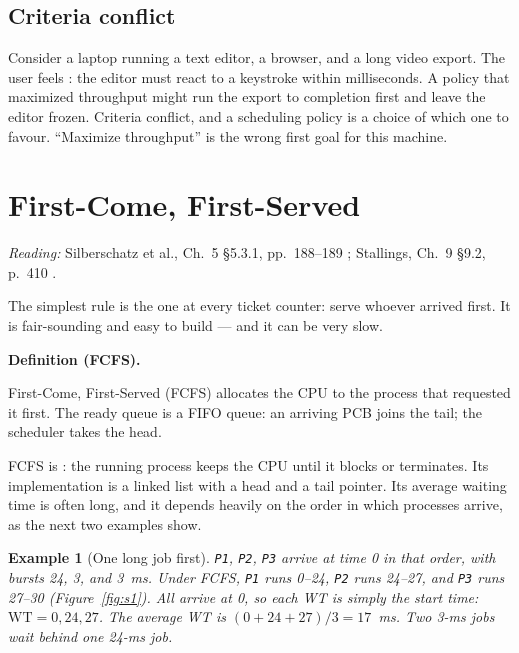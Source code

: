 \documentclass[11pt]{article}
\newtheorem{example}{Example}
\newenvironment{definitionbox}[1]{%
  \par\noindent\textbf{Definition (#1).}\ \itshape
}{\par\vspace{0.3em}}
\begin{document}
\subsection*{Criteria conflict}

Consider a laptop running a text editor, a browser, and a long video export.
The user feels : the editor must react to a keystroke within
milliseconds. A policy that maximized throughput might run the export to
completion first and leave the editor frozen. Criteria conflict, and a
scheduling policy is a choice of which one to favour. ``Maximize throughput''
is the wrong first goal for this machine.

\section{First-Come, First-Served}
\label{sec:fcfs}

\noindent\emph{Reading:} Silberschatz et al., Ch.~5 \S5.3.1, pp.~188--189
\cite{SilberschatzOSC_operating_system_concepts}; Stallings, Ch.~9 \S9.2,
p.~410 \cite{StallingsOS_internals_design_principles}.

The simplest rule is the one at every ticket counter: serve whoever arrived
first. It is fair-sounding and easy to build --- and it can be very slow.

\begin{definitionbox}{FCFS}
First-Come, First-Served (FCFS) allocates the CPU to the process that requested
it first. The ready queue is a FIFO queue: an arriving PCB joins the tail; the
scheduler takes the head.
\end{definitionbox}

FCFS is : the running process keeps the CPU until it blocks
or terminates. Its implementation is a linked list with a head and a tail
pointer. Its average waiting time is often long, and it depends heavily on the
order in which processes arrive, as the next two examples show.

\begin{example}[One long job first]
\label{ex:convoy}
\texttt{P1}, \texttt{P2}, \texttt{P3} arrive at time 0 in that order, with
bursts 24, 3, and 3~ms. Under FCFS, \texttt{P1} runs 0--24, \texttt{P2} runs
24--27, and \texttt{P3} runs 27--30 (Figure~\ref{fig:s1}). All arrive at 0, so
each WT is simply the start time: $\mathrm{WT} = 0, 24, 27$. The average WT is
$(0 + 24 + 27)/3 = 17$~ms. Two 3-ms jobs wait behind one 24-ms job.
\end{example}
\end{document}
